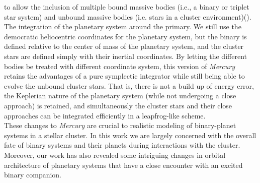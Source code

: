 \documentclass{aastex631}
\begin{document}
to allow the inclusion of multiple bound massive bodies (i.e., a binary or triplet star system) and unbound massive bodies (i.e. stars in a cluster environment)(\cite{kai17}).
The integration of the planetary system around the primary. We still use the democratic heliocentric coordinates for the planetary system, but the binary
is defined relative to the center of mass of the planetary system, and the cluster stars are defined simply with their inertial coordinates. By letting the different
bodies be treated with different coordinate system, this version of \textit{Mercury} retains the advantages of a pure symplectic integrator while still being able 
to evolve the unbound cluster stars. That is, there is not a build up of energy error, the Keplerian nature of the planetary system (while not undergoing a close approach)
is retained, and simultaneously the cluster stars and their close approaches can be integrated efficiently in a leapfrog-like scheme. \\
\indent These changes to \textit{Mercury} are crucial to realistic modeling of binary-planet systems in a stellar cluster.
 In this work we are largely concerned with the overall fate of binary systems and their planets during interactions with the cluster. Moreover, our
work has also revealed some intriguing changes in orbital architecture of planetary systems that have a close encounter with an excited binary companion.
\end{document}
